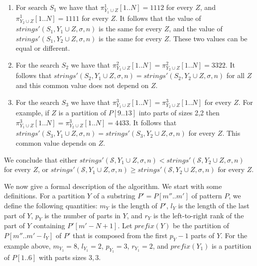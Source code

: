 \documentclass[12pt]{article}
\newcommand{\substr}[3]{#1[#2..#3]}
\newcommand{\scheme}{\mathcal{S}}
\newcommand{\numstrings}{\mathit{strings}}
\newcommand{\numstringsp}{\numstrings'}
\newcommand{\lognc}{N}
\newcommand{\ppartition}{Y}
\newcommand{\spartition}{Z}
\newcommand{\plen}[1]{m_{#1}}
\newcommand{\plast}[1]{l_{#1}}
\newcommand{\pnumparts}[1]{p_{#1}}
\newcommand{\prank}[1]{r_{#1}}
\newcommand{\pprefix}[1]{\mathit{prefix}(#1)}
\begin{document}
\begin{enumerate}
\item
For search $S_1$ we have that 
$\substr{\pi^1_{\ppartition_1 \cup \spartition}}{1}{\lognc} = 1112$
for every $\spartition$, and 
$\substr{\pi^1_{\ppartition_2 \cup \spartition}}{1}{\lognc} = 1111$
for every $\spartition$.
It follows that the value of
$\numstringsp(S_1,\ppartition_1 \cup \spartition,\sigma,n)$ is the same
for every $\spartition$, and the value of 
$\numstringsp(S_1,\ppartition_2 \cup \spartition,\sigma,n)$ is the same
for every $\spartition$.
These two values can be equal or different.

\item
For the search $S_2$ we have that 
$\substr{\pi^2_{\ppartition_1 \cup \spartition}}{1}{\lognc} = 
 \substr{\pi^2_{\ppartition_2 \cup \spartition}}{1}{\lognc} = 3322$.
It follows that
$\numstringsp(S_2,\ppartition_1 \cup \spartition,\sigma,n) =
 \numstringsp(S_2,\ppartition_2 \cup \spartition,\sigma,n)$
for all $\spartition$ and this common value does not depend on $\spartition$.

\item
For the search $S_3$ we have that 
$\substr{\pi^3_{\ppartition_1 \cup \spartition}}{1}{\lognc} =
 \substr{\pi^3_{\ppartition_2 \cup \spartition}}{1}{\lognc}$
for every $\spartition$.
For example, if $\spartition$ is a partition of $\substr{P}{9}{13}$
into parts of sizes 2,2 then 
$\substr{\pi^3_{\ppartition_1 \cup \spartition}}{1}{\lognc} =
 \substr{\pi^3_{\ppartition_2 \cup \spartition}}{1}{\lognc} = 4433$.
It follows that
$\numstringsp(S_3,\ppartition_1 \cup \spartition,\sigma,n) =
 \numstringsp(S_3,\ppartition_2 \cup \spartition,\sigma,n)$
for every $\spartition$.
This common value depends on $\spartition$.

\end{enumerate}
We conclude that either 
$\numstringsp(\scheme,\ppartition_1 \cup \spartition,\sigma,n) < 
 \numstringsp(\scheme,\ppartition_2 \cup \spartition,\sigma,n)$
for every $\spartition$,
or $\numstringsp(\scheme,\ppartition_1 \cup \spartition,\sigma,n) \geq 
 \numstringsp(\scheme,\ppartition_2 \cup
 \spartition,\sigma,n)$
for every $\spartition$.


We now give a formal description of the algorithm.
We start with some definitions.
For a partition $\ppartition$ of a substring $P'=\substr{P}{m''}{m'}$ of 
pattern $P$, we define the following quantities:
$\plen{\ppartition}$ is the length of $P'$,
$\plast{\ppartition}$ is the length of the last part of $\ppartition$,
$\pnumparts{\ppartition}$ is the number of parts in $\ppartition$,
and $\prank{\ppartition}$ is the left-to-right rank of the part of
$\ppartition$ containing $P'[m'-\lognc+1]$.
Let $\pprefix{\ppartition}$ be the partition of 
$\substr{P}{m''}{m'-\plast{\ppartition}}$ of $P'$ that is
composed from the first $\pnumparts{\ppartition}-1$ parts of $\ppartition$.
For the example above,
$\plen{\ppartition_1} = 8$,
$\plast{\ppartition_1} = 2$,
$\pnumparts{\ppartition_1} = 3$,
$\prank{\ppartition_1} = 2$, and
$\pprefix{\ppartition_1}$ is a partition of $\substr{P}{1}{6}$ with
parts sizes $3,3$.
\end{document}
